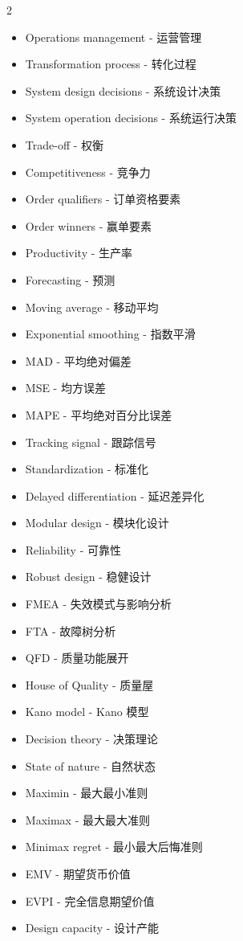 \documentclass[10pt,a4paper]{ctexart}
\begin{document}
\begin{multicols}{2}
\begin{itemize}
  \item Operations management - 运营管理
  \item Transformation process - 转化过程
  \item System design decisions - 系统设计决策
  \item System operation decisions - 系统运行决策
  \item Trade-off - 权衡
  \item Competitiveness - 竞争力
  \item Order qualifiers - 订单资格要素
  \item Order winners - 赢单要素
  \item Productivity - 生产率
  \item Forecasting - 预测
  \item Moving average - 移动平均
  \item Exponential smoothing - 指数平滑
  \item MAD - 平均绝对偏差
  \item MSE - 均方误差
  \item MAPE - 平均绝对百分比误差
  \item Tracking signal - 跟踪信号
  \item Standardization - 标准化
  \item Delayed differentiation - 延迟差异化
  \item Modular design - 模块化设计
  \item Reliability - 可靠性
  \item Robust design - 稳健设计
  \item FMEA - 失效模式与影响分析
  \item FTA - 故障树分析
  \item QFD - 质量功能展开
  \item House of Quality - 质量屋
  \item Kano model - Kano 模型
  \item Decision theory - 决策理论
  \item State of nature - 自然状态
  \item Maximin - 最大最小准则
  \item Maximax - 最大最大准则
  \item Minimax regret - 最小最大后悔准则
  \item EMV - 期望货币价值
  \item EVPI - 完全信息期望价值
  \item Design capacity - 设计产能

\end{itemize}
\end{multicols}
\end{document}
